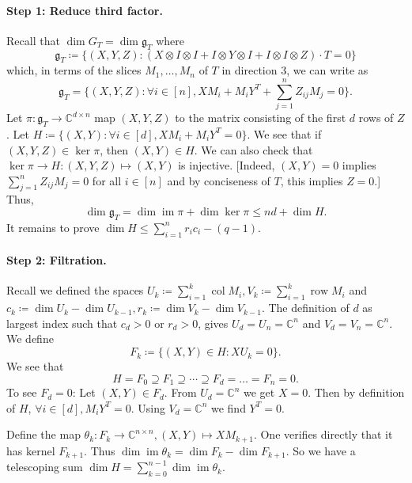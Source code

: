 \documentclass[11pt,a4paper]{article}
\numberwithin{equation}{section}
\newcommand{\CC}{\mathbb{C}}
\DeclareMathOperator{\col}{col}
\DeclareMathOperator{\row}{row}
\DeclareMathOperator{\im}{im}
\begin{document}
\paragraph{Step 1: Reduce third factor.}
Recall that $\dim G_T = \dim \mathfrak{g}_T$ %
where
\[
\mathfrak{g}_T \coloneq \{(X,Y,Z) : (X \otimes I \otimes I + I \otimes Y \otimes I + I \otimes I \otimes Z)\cdot T = 0\}
\]
which, in terms of the slices $M_1,\ldots, M_n$ of $T$ in direction 3, we can write as
\[
\mathfrak{g}_T = \{(X,Y,Z) : \forall i \in [n], X M_i + M_i Y^T + \sum_{j=1}^n Z_{ij}M_j = 0\}.
\]
Let $\pi : \mathfrak{g}_T \to \CC^{d\times n}$ map $(X,Y,Z)$ to the matrix consisting of the first $d$ rows of $Z$. Let $H \coloneqq \{(X,Y) : \forall i \in [d], XM_i + M_i Y^T = 0\}$. We see that if $(X,Y,Z) \in \ker \pi$, then $(X,Y) \in H$. We can also check that $\ker \pi \to H : (X,Y,Z) \mapsto (X,Y)$ is injective. [Indeed, $(X,Y)=0$ implies $\sum_{j=1}^n Z_{ij} M_j=0$ for all $i\in [n]$ and by conciseness of $T$, this implies $Z=0$.] Thus,
\[
\dim \mathfrak{g}_T = \dim \im \pi + \dim \ker \pi \leq nd + \dim H.
\]
It remains to prove $\dim H \leq \sum_{i=1}^n r_i c_i - (q-1)$.

\paragraph{Step 2: Filtration.}
Recall we defined the spaces
$U_k \coloneqq \sum_{i=1}^k \col M_i, 
V_k \coloneqq \sum_{i=1}^k \row M_i$ and $c_k \coloneqq \dim U_k - \dim U_{k-1},  r_k \coloneqq \dim V_k - \dim V_{k-1}$. The definition of $d$ as largest index such that $c_d > 0$ or $r_d > 0$, gives $U_d = U_n = \CC^n$ and $V_d = V_n = \CC^n$. We define
\[
F_k \coloneqq \{(X,Y) \in H : X U_k = 0\}.
\]
We see that
\[
H = F_0 \supseteq F_1 \supseteq \cdots \supseteq F_d = \dots= F_n= 0.
\]
To see $F_d = 0$: Let $(X,Y) \in F_d$. From $U_d = \CC^n$ we get $X = 0$. Then by definition of $H$, $\forall i \in [d], M_iY^T = 0$. Using $V_d = \CC^n$ we find $Y^T = 0$.

Define the map $\theta_k : F_k \to \CC^{n \times n} , (X,Y) \mapsto X M_{k+1}$. One verifies directly that it has kernel $F_{k+1}$. Thus $\dim \im \theta_k = \dim F_k - \dim F_{k+1}$. So we have a telescoping sum $\dim H = \sum_{k=0}^{n-1} \dim \im \theta_k$.
\end{document}
